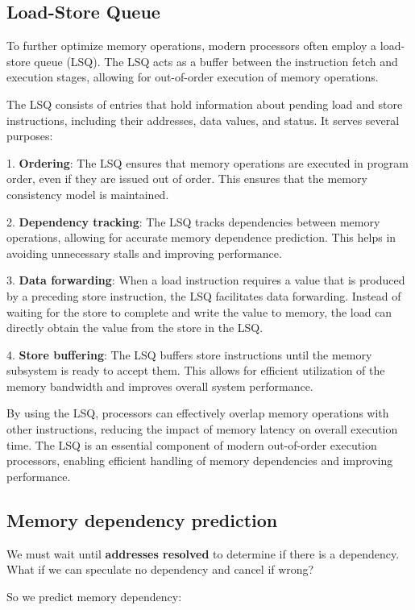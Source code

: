 \documentclass[letterpaper,12pt]{article}
\begin{document}
\subsection{Load-Store Queue}
To further optimize memory operations, modern processors often employ a load-store queue (LSQ). The LSQ acts as a buffer between the instruction fetch and execution stages, allowing for out-of-order execution of memory operations.

The LSQ consists of entries that hold information about pending load and store instructions, including their addresses, data values, and status. It serves several purposes:

1. \textbf{Ordering}: The LSQ ensures that memory operations are executed in program order, even if they are issued out of order. This ensures that the memory consistency model is maintained.

2. \textbf{Dependency tracking}: The LSQ tracks dependencies between memory operations, allowing for accurate memory dependence prediction. This helps in avoiding unnecessary stalls and improving performance.

3. \textbf{Data forwarding}: When a load instruction requires a value that is produced by a preceding store instruction, the LSQ facilitates data forwarding. Instead of waiting for the store to complete and write the value to memory, the load can directly obtain the value from the store in the LSQ.

4. \textbf{Store buffering}: The LSQ buffers store instructions until the memory subsystem is ready to accept them. This allows for efficient utilization of the memory bandwidth and improves overall system performance.

By using the LSQ, processors can effectively overlap memory operations with other instructions, reducing the impact of memory latency on overall execution time. The LSQ is an essential component of modern out-of-order execution processors, enabling efficient handling of memory dependencies and improving performance.

\subsection{Memory dependency prediction}
We must wait until \textbf{addresses resolved} to determine if there is a dependency. What if we can speculate no dependency and cancel if wrong?

So we predict memory dependency:
\end{document}
